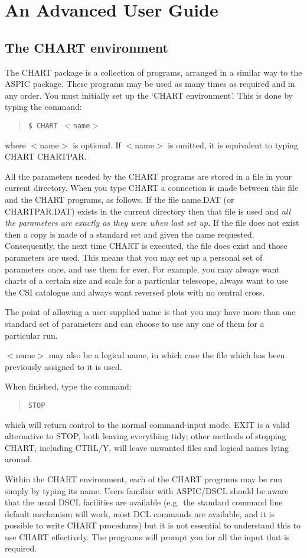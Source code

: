 \documentclass{article}
\begin{document}
\section{An Advanced User Guide}
\subsection{The CHART environment}
\label{env}
The CHART package is a collection of programs, arranged in a similar way to the
ASPIC package.
These programs may be used as many times as required and in any order.
You must initially set up the `CHART environment'.
This is done by typing the command:
\begin{quote}
{\tt \$ CHART $<$name$>$}
\end{quote}
where $<$name$>$ is optional.
If $<$name$>$ is omitted, it is equivalent to typing  CHART CHARTPAR.

All the parameters needed by the CHART programs are stored in a file in your
current directory.
When you type CHART a connection is made between this file and the CHART
programs, as follows.
If the file name.DAT (or CHARTPAR.DAT) exists in the current directory then that
file is used and {\em all the parameters are exactly as they were when last
set up.}
If the file does not exist then a copy is made of a standard set and given the
name requested.
Consequently, the next time CHART is executed, the file does exist and those
parameters are used.
This means that you may set up a personal set of parameters once, and use them
for ever.
For example, you may always want charts of a certain size and scale for a
particular telescope, always want to use the CSI catalogue and always want
reversed plots with no central cross.

The point of allowing a user-supplied name is that you may have more than one
standard set of parameters and can choose to use any one of them for a
particular run.

$<$name$>$ may also be a logical name, in which case the file which has been
previously assigned to it is used.

When finished, type the command:
\begin{quote}
{\tt STOP}
\end{quote}
which will return control to the normal command-input mode.
EXIT is a valid alternative to STOP, both leaving everything tidy; other methods
of stopping CHART, including CTRL/Y, will leave unwanted files and logical
names lying around.

Within the CHART environment, each of the CHART programs may be run simply by
typing its name.
Users familiar with ASPIC/DSCL should be aware that the usual DSCL facilities
are available (e.g.\ the standard command line default mechanism will work, most
DCL commands are available, and it is possible to write CHART procedures) but it
is not essential to understand this to use CHART effectively.
The programs will prompt you for all the input that is required.
\end{document}
